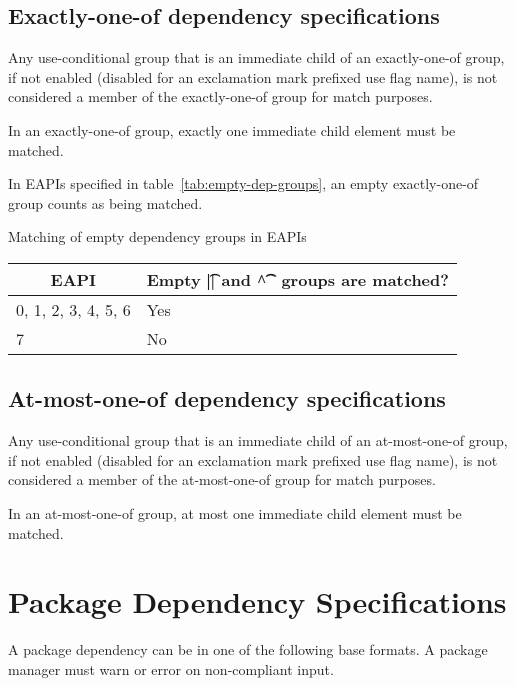 \subsection{Exactly-one-of dependency specifications}

Any use-conditional group that is an immediate child of an exactly-one-of group, if not enabled
(disabled for an exclamation mark prefixed use flag name), is not considered a member of the
exactly-one-of group for match purposes.

In an exactly-one-of group, exactly one immediate child element must be matched.

In EAPIs specified in table~\ref{tab:empty-dep-groups}, an empty exactly-one-of group counts as
being matched.

\begin{centertable}{Matching of empty dependency groups in EAPIs}
    \label{tab:empty-dep-groups}
    \begin{tabular}{ll}
      \toprule
      \multicolumn{1}{c}{\textbf{EAPI}} &
      \multicolumn{1}{c}{\textbf{Empty \t{||} and \t{\textasciicircum\textasciicircum} groups
        are matched?}} \\
      \midrule
      0, 1, 2, 3, 4, 5, 6 & Yes \\
      7                   & No  \\
      \bottomrule
    \end{tabular}
\end{centertable}

\subsection{At-most-one-of dependency specifications}

Any use-conditional group that is an immediate child of an at-most-one-of group, if not enabled
(disabled for an exclamation mark prefixed use flag name), is not considered a member of the
at-most-one-of group for match purposes.

In an at-most-one-of group, at most one immediate child element must be matched.

\section{Package Dependency Specifications}

A package dependency can be in one of the following base formats. A package manager must warn or
error on non-compliant input.

